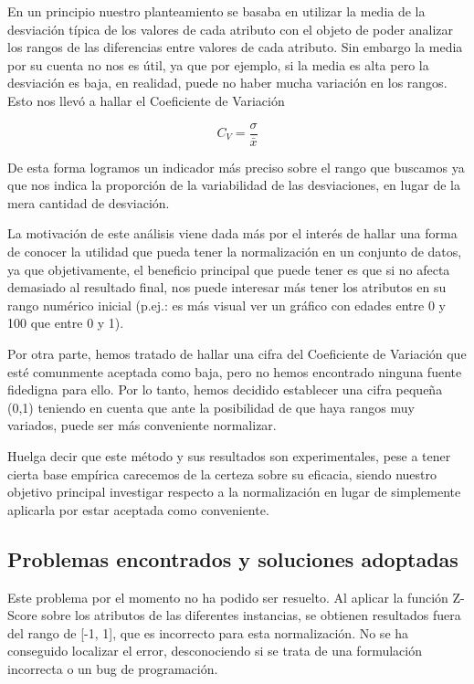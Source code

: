 \documentclass[10pt,a4paper]{article}
\begin{document}
En un principio nuestro planteamiento se basaba en utilizar la media de la desviación típica de los valores de cada atributo con el objeto de poder analizar los rangos 
de las diferencias entre valores de cada atributo. Sin embargo la media por su cuenta no nos es útil, ya que por ejemplo, si la media es alta pero la desviación es baja, 
en realidad, puede no haber mucha variación en los rangos. Esto nos llevó a hallar el Coeficiente de Variación

\begin{equation}
C_{V}=\frac{\sigma}{\bar{x}}
 \end{equation}

De esta forma logramos un indicador más preciso sobre el rango que buscamos ya que nos indica la proporción de la variabilidad de las desviaciones, en lugar de la mera 
cantidad de desviación.

La motivación de este análisis viene dada más por el interés de hallar una forma de conocer la utilidad que pueda tener la normalización en un conjunto de datos, ya que
 objetivamente, el beneficio principal que puede tener es que si no afecta demasiado al resultado final, nos puede interesar más tener los atributos en su rango numérico inicial (p.ej.: es más visual ver un gráfico con edades entre 0 y 100 que entre 0 y 1).

Por otra parte, hemos tratado de hallar una cifra del Coeficiente de Variación que esté comunmente aceptada como baja, pero no hemos encontrado ninguna fuente fidedigna 
para ello. Por lo tanto, hemos decidido establecer una cifra pequeña (0,1) teniendo en cuenta que ante la posibilidad de que haya rangos muy variados, puede ser más 
conveniente normalizar.

Huelga decir que este método y sus resultados son experimentales, pese a tener cierta base empírica carecemos de la certeza sobre su eficacia, siendo nuestro objetivo 
principal investigar respecto a la normalización en lugar de simplemente aplicarla por estar aceptada como conveniente. 


\subsection{Problemas encontrados y soluciones adoptadas}


Este problema por el momento no ha podido ser resuelto. Al aplicar la función Z-Score sobre los atributos de las diferentes instancias, se obtienen resultados fuera del 
rango de [-1, 1], que es incorrecto para esta normalización. No se ha conseguido localizar el error, desconociendo si se trata de una formulación incorrecta o un bug de 
programación.
\end{document}
